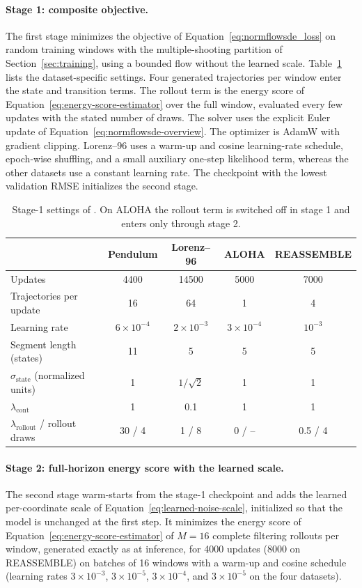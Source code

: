 \paragraph{Stage 1: composite objective.}
The first stage minimizes the objective of Equation~\eqref{eq:normflowsde_loss} on random training windows with the multiple-shooting partition of Section~\ref{sec:training}, using a bounded flow without the learned scale. Table~\ref{tab:nfsde-stage1} lists the dataset-specific settings. Four generated trajectories per window enter the state and transition terms. The rollout term is the energy score of Equation~\eqref{eq:energy-score-estimator} over the full window, evaluated every few updates with the stated number of draws. The solver uses the explicit Euler update of Equation~\eqref{eq:normflowsde-overview}. The optimizer is AdamW with gradient clipping. Lorenz--96 uses a warm-up and cosine learning-rate schedule, epoch-wise shuffling, and a small auxiliary one-step likelihood term, whereas the other datasets use a constant learning rate. The checkpoint with the lowest validation RMSE initializes the second stage.
\begin{table}[htbp]
\centering\footnotesize
\begin{tabular}{lcccc}
\toprule
 & Pendulum & Lorenz--96 & ALOHA & REASSEMBLE \\
\midrule
Updates & 4400 & 14500 & 5000 & 7000 \\
Trajectories per update & 16 & 64 & 1 & 4 \\
Learning rate & $6\times10^{-4}$ & $2\times10^{-3}$ & $3\times10^{-4}$ & $10^{-3}$ \\
Segment length (states) & 11 & 5 & 5 & 5 \\
$\sigma_{\mathrm{state}}$ (normalized units) & 1 & $1/\sqrt2$ & 1 & 1 \\
$\lambda_{\mathrm{cont}}$ & 1 & 0.1 & 1 & 1 \\
$\lambda_{\mathrm{rollout}}$ / rollout draws & 30 / 4 & 1 / 8 & 0 / -- & 0.5 / 4 \\
\bottomrule
\end{tabular}
\caption{Stage-1 settings of \method. On ALOHA the rollout term is switched off in stage 1 and enters only through stage 2.}
\label{tab:nfsde-stage1}
\end{table}

\paragraph{Stage 2: full-horizon energy score with the learned scale.}
The second stage warm-starts from the stage-1 checkpoint and adds the learned per-coordinate scale of Equation~\eqref{eq:learned-noise-scale}, initialized so that the model is unchanged at the first step. It minimizes the energy score of Equation~\eqref{eq:energy-score-estimator} of $M=16$ complete filtering rollouts per window, generated exactly as at inference, for 4000 updates (8000 on REASSEMBLE) on batches of 16 windows with a warm-up and cosine schedule (learning rates $3\times10^{-3}$, $3\times10^{-5}$, $3\times10^{-4}$, and $3\times10^{-5}$ on the four datasets). 

